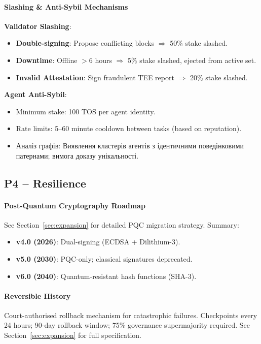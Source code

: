 \documentclass[11pt]{article}
\begin{document}
\paragraph{Slashing \& Anti-Sybil Mechanisms}
\textbf{Validator Slashing}:
\begin{itemize}[noitemsep]
  \item \textbf{Double-signing}: Propose conflicting blocks $\Rightarrow$ 50\% stake slashed.
  \item \textbf{Downtime}: Offline $>$6 hours $\Rightarrow$ 5\% stake slashed, ejected from active set.
  \item \textbf{Invalid Attestation}: Sign fraudulent TEE report $\Rightarrow$ 20\% stake slashed.
\end{itemize}

\textbf{Agent Anti-Sybil}:
\begin{itemize}[noitemsep]
  \item Minimum stake: 100 TOS per agent identity.
  \item Rate limits: 5--60 minute cooldown between tasks (based on reputation).
  \item Аналіз графів: Виявлення кластерів агентів з ідентичними поведінковими патернами; вимога доказу унікальності.
\end{itemize}

\subsection{P4 -- Resilience}
\label{sec:pillar-resilience}

\paragraph{Post-Quantum Cryptography Roadmap}
See Section~\ref{sec:expansion} for detailed PQC migration strategy. Summary:
\begin{itemize}[noitemsep]
  \item \textbf{v4.0 (2026)}: Dual-signing (ECDSA + Dilithium-3).
  \item \textbf{v5.0 (2030)}: PQC-only; classical signatures deprecated.
  \item \textbf{v6.0 (2040)}: Quantum-resistant hash functions (SHA-3).
\end{itemize}

\paragraph{Reversible History}
Court-authorised rollback mechanism for catastrophic failures. Checkpoints every 24 hours; 90-day rollback window; 75\% governance supermajority required. See Section~\ref{sec:expansion} for full specification.
\end{document}
